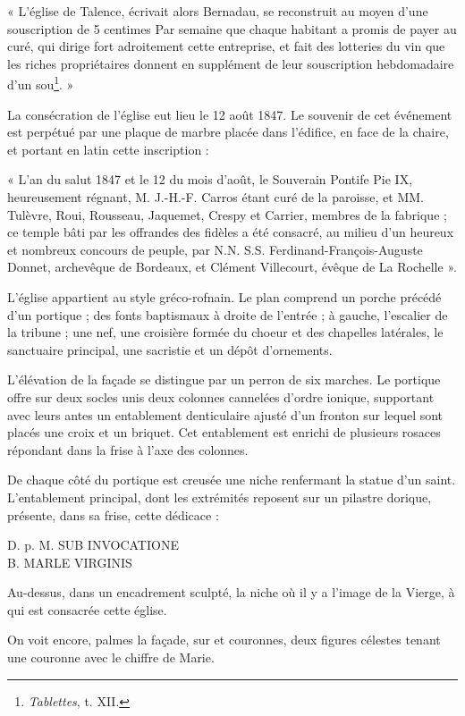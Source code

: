 \documentclass[a4paper,11pt]{book}
\begin{document}
« L'église de Talence, écrivait alors Bernadau, se reconstruit au moyen d'une souscription de 5 centimes Par semaine que chaque habitant a promis de payer au curé, qui dirige fort adroitement cette entreprise, et fait des lotteries du vin que les riches propriétaires donnent en supplément de leur souscription hebdomadaire d'un sou\footnote{\textit{Tablettes}, t. XII.}. »

La consécration de l'église eut lieu le 12 août 1847. Le souvenir de cet événement est perpétué par une plaque de marbre placée dans l'édifice, en face de la chaire, et portant en latin cette inscription :

« L'an du salut 1847 et le 12 du mois d'août, le Souverain Pontife Pie IX, heureusement régnant, M. J.-H.-F. Carros étant curé de la paroisse, et MM. Tulèvre, Roui, Rousseau, Jaquemet, Crespy et Carrier, membres de la fabrique ; ce temple bâti par les offrandes des fidèles a été consacré, au milieu d'un heureux et nombreux concours de peuple, par N.N. S.S. Ferdinand-François-Auguste Donnet, archevêque de Bordeaux, et Clément Villecourt, évêque de La Rochelle ».

L'église appartient au style gréco-rofnain. Le plan comprend un porche précédé d'un portique ; des fonts baptismaux à droite de l'entrée ; à gauche, l'escalier de la tribune ; une nef, une croisière formée du choeur et des chapelles latérales, le sanctuaire principal, une sacristie et un dépôt d'ornements.

L'élévation de la façade se distingue par un perron de six marches. Le portique offre sur deux socles unis deux colonnes cannelées d'ordre ionique, supportant avec leurs antes un entablement denticulaire ajusté d'un fronton sur lequel sont placés une croix et un briquet. Cet entablement est enrichi de plusieurs rosaces répondant dans la frise à l'axe des colonnes.

De chaque côté du portique est creusée une niche renfermant la statue d'un saint. L'entablement principal, dont les extrémités reposent sur un pilastre dorique, présente, dans sa frise, cette dédicace :

\begin{center}
D. p. M. SUB INVOCATIONE\\
B. MARLE VIRGINIS
\end{center}

Au-dessus, dans un encadrement sculpté, la niche où il y a l'image de la Vierge, à qui est consacrée cette église.

On voit encore, palmes la façade, sur et couronnes, deux figures célestes tenant une couronne avec le chiffre de Marie.
\end{document}
